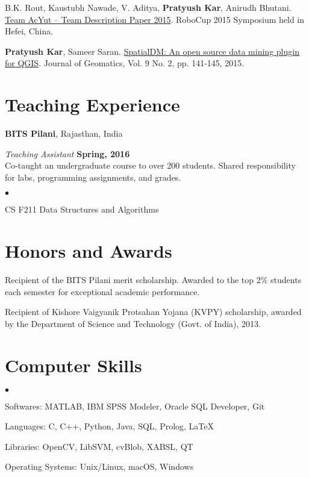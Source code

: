 \documentclass[margin,line]{res}
\newenvironment{list2}{
  \begin{list}{$\bullet$}{%
      \setlength{\itemsep}{0in}
      \setlength{\parsep}{0in} \setlength{\parskip}{0in}
      \setlength{\topsep}{0in} \setlength{\partopsep}{0in} 
      \setlength{\leftmargin}{0.2in}}}{\end{list}}
\begin{document}
\begin{resume}
B.K. Rout, Kaustubh Nawade, V. Aditya, {\bf Pratyush Kar}, Anirudh Bhutani. \href{https://p-kar.github.io/files/TDP15.pdf}{Team AcYut -- Team Description Paper 2015}. RoboCup 2015 Symposium held in Hefei, China.

{\bf Pratyush Kar}, Sameer Saran. \href{https://p-kar.github.io/files/JOG15.pdf}{SpatialDM: An open source data mining plugin for QGIS}. Journal of Geomatics, Vol. 9 No. 2, pp. 141-145, 2015.

\section{\sc Teaching Experience}
{\bf BITS Pilani}, Rajasthan, India

\vspace{-.3cm}
{\em Teaching Assistant} \hfill {\bf Spring, 2016}\\
Co-taught an undergraduate course to over 200 students.  Shared responsibility for labs, programming assignments, and grades.
\vspace*{.05in}  
\begin{list2}
\item CS F211 Data Structures and Algorithms
\end{list2}


\section{\sc Honors and Awards}

Recipient of the BITS Pilani merit scholarship. Awarded to the top 2\% students each semester for exceptional academic performance.

\vspace*{-2.5mm}
Recipient of Kishore Vaigyanik Protsahan Yojana (KVPY) scholarship, awarded by the Department of Science and Technology (Govt. of India), 2013.


\section{\sc Computer Skills} 
\begin{list2}
\item Softwares: MATLAB, IBM SPSS Modeler, Oracle SQL Developer, Git
\item Languages:  C, C++, Python, Java, SQL, Prolog, \LaTeX
\item Libraries: OpenCV, LibSVM, cvBlob, XABSL, QT
\item Operating Systems:  Unix/Linux, macOS, Windows
\end{list2}



\end{resume}
\end{document}
